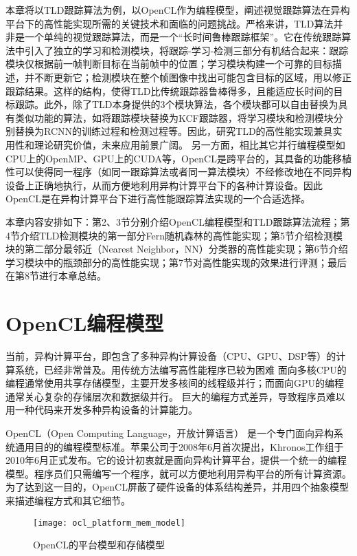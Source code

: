 本章将以TLD跟踪算法为例，以OpenCL作为编程模型，阐述视觉跟踪算法在异构平台下的高性能实现所需的关键技术和面临的问题挑战。严格来讲，TLD算法并非是一个单纯的视觉跟踪算法，而是一个``长时间鲁棒跟踪框架''。它在传统跟踪算法中引入了独立的学习和检测模块，将跟踪-学习-检测三部分有机结合起来：跟踪模块仅根据前一帧判断目标在当前帧中的位置；学习模块构建一个可靠的目标描述，并不断更新它；检测模块在整个帧图像中找出可能包含目标的区域，用以修正跟踪结果。这样的结构，使得TLD比传统跟踪器鲁棒得多，且能适应长时间的目标跟踪。此外，除了TLD本身提供的3个模块算法，各个模块都可以自由替换为具有类似功能的算法，如将跟踪模块替换为KCF跟踪器，将学习模块和检测模块分别替换为RCNN的训练过程和检测过程等。因此，研究TLD的高性能实现兼具实用性和理论研究价值，未来应用前景广阔。
另一方面，相比其它并行编程模型如CPU上的OpenMP、GPU上的CUDA等，OpenCL是跨平台的，其具备的功能移植性可以使得同一程序（如同一跟踪算法或者同一算法模块）不经修改地在不同异构设备上正确地执行，从而方便地利用异构计算平台下的各种计算设备。因此OpenCL是在异构计算平台下进行高性能跟踪算法实现的一个合适选择。

本章内容安排如下：第2、3节分别介绍OpenCL编程模型和TLD跟踪算法流程；第4节介绍TLD检测模块的第一部分\pozhehao Fern随机森林的高性能实现；第5节介绍检测模块的第二部分\pozhehao 最邻近（Nearest Neighbor，NN）分类器的高性能实现；第6节介绍学习模块中的瓶颈部分的高性能实现；第7节对高性能实现的效果进行评测；最后在第8节进行本章总结。

\section{OpenCL编程模型}
\label{oclmodels}
当前，异构计算平台，即包含了多种异构计算设备（CPU、GPU、DSP等）的计算系统，已经非常普及。用传统方法编写高性能程序已较为困难\pozhehao
面向多核CPU的编程通常使用共享存储模型，主要开发多核间的线程级并行；而面向GPU的编程通常关心复杂的存储层次和数据级并行。
巨大的编程方式差异，导致程序员难以用一种代码来开发多种异构设备的计算能力。

OpenCL（Open Computing Language，开放计算语言） 是一个专门面向异构系统通用目的的编程模型标准。苹果公司于2008年6月首次提出，Khronos工作组于2010年6月正式发布。它的设计初衷就是面向异构计算平台，提供一个统一的编程模型。程序员们只需编写一个程序，就可以方便地利用异构平台的所有计算资源。为了达到这一目的，OpenCL屏蔽了硬件设备的体系结构差异，并用四个抽象模型来描述编程方式和其它细节。

\begin{figure}[htb]
  \centering
  \texttt{[image: ocl\_platform\_mem\_model]}
  \caption{OpenCL的平台模型和存储模型}
  \label{oclplatformandmem}
\end{figure}

